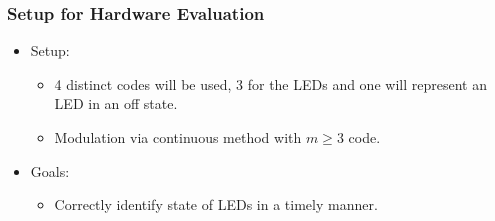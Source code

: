 \documentclass{beamer}
\begin{document}
	\begin{frame}\frametitle{Setup for Hardware Evaluation}
		
	
		\begin{itemize}

			\item Setup: 
			\begin{itemize}

				\item 4 distinct codes will be used, 3 for the LEDs and one will represent an LED in an off state.

				\item Modulation via continuous method with $m \ge 3$ code.
			\end{itemize}

			\item Goals:
			\begin{itemize}


				\item Correctly identify state of LEDs in a timely manner.

			\end{itemize}



		\end{itemize}
	\end{frame}



\end{document}
